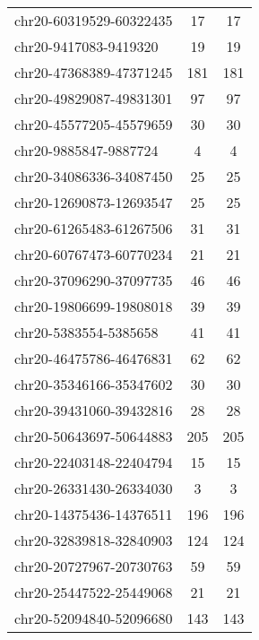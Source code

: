 \begin{longtable}{lSS}
	chr20-60319529-60322435 & 17   & 17                              \\
	chr20-9417083-9419320   & 19   & 19                              \\
	chr20-47368389-47371245 & 181  & 181                             \\
	chr20-49829087-49831301 & 97   & 97                              \\
	chr20-45577205-45579659 & 30   & 30                              \\
	chr20-9885847-9887724   & 4    & 4                               \\
	chr20-34086336-34087450 & 25   & 25                              \\
	chr20-12690873-12693547 & 25   & 25                              \\
	chr20-61265483-61267506 & 31   & 31                              \\
	chr20-60767473-60770234 & 21   & 21                              \\
	chr20-37096290-37097735 & 46   & 46                              \\
	chr20-19806699-19808018 & 39   & 39                              \\
	chr20-5383554-5385658   & 41   & 41                              \\
	chr20-46475786-46476831 & 62   & 62                              \\
	chr20-35346166-35347602 & 30   & 30                              \\
	chr20-39431060-39432816 & 28   & 28                              \\
	chr20-50643697-50644883 & 205  & 205                             \\
	chr20-22403148-22404794 & 15   & 15                              \\
	chr20-26331430-26334030 & 3    & 3                               \\
	chr20-14375436-14376511 & 196  & 196                             \\
	chr20-32839818-32840903 & 124  & 124                             \\
	chr20-20727967-20730763 & 59   & 59                              \\
	chr20-25447522-25449068 & 21   & 21                              \\
	chr20-52094840-52096680 & 143  & 143                             \\

\end{longtable}
